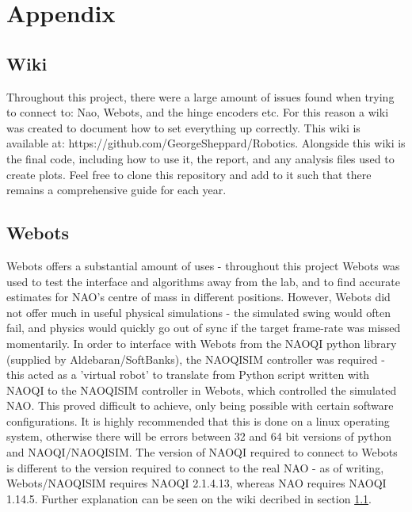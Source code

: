 \documentclass[11pt]{article}
\newcommand*\ruleline[1]{\par\noindent\raisebox{.8ex}{\makebox[\linewidth]{\hrulefill\hspace{1ex}\raisebox{-.8ex}{#1}\hspace{1ex}\hrulefill}}}
\begin{document}
\appendix
\section{Appendix}
\subsection{Wiki} \label{sec:wiki}
\ruleline{George Sheppard}
Throughout this project, there were a large amount of issues found when trying to connect to: Nao, Webots, and the hinge encoders etc. For this reason a wiki was created to document how to set everything up correctly. This wiki is available at: https://github.com/GeorgeSheppard/Robotics. Alongside this wiki is the final code, including how to use it, the report, and any analysis files used to create plots. Feel free to clone this repository and add to it such that there remains a comprehensive guide for each year.

\subsection{Webots}
\ruleline{James Doering}
Webots offers a substantial amount of uses - throughout this project Webots was used to test the interface and algorithms away from the lab, and to find accurate estimates for NAO's centre of mass in different positions. However, Webots did not offer much in useful physical simulations - the simulated swing would often fail, and physics would quickly go out of sync if the target frame-rate was missed momentarily. In order to interface with Webots from the NAOQI python library (supplied by Aldebaran/SoftBanks), the NAOQISIM controller was required - this acted as a 'virtual robot' to translate from Python script written with NAOQI to the NAOQISIM controller in Webots, which controlled the simulated NAO. This proved difficult to achieve, only being possible with certain software configurations. It is highly recommended that this is done on a linux operating system, otherwise there will be errors between 32 and 64 bit versions of python and NAOQI/NAOQISIM. The version of NAOQI required to connect to Webots is different to the version required to connect to the real NAO - as of writing, Webots/NAOQISIM requires NAOQI 2.1.4.13, whereas NAO requires NAOQI 1.14.5. Further explanation can be seen on the wiki decribed in section \ref{sec:wiki}.



\end{document}

